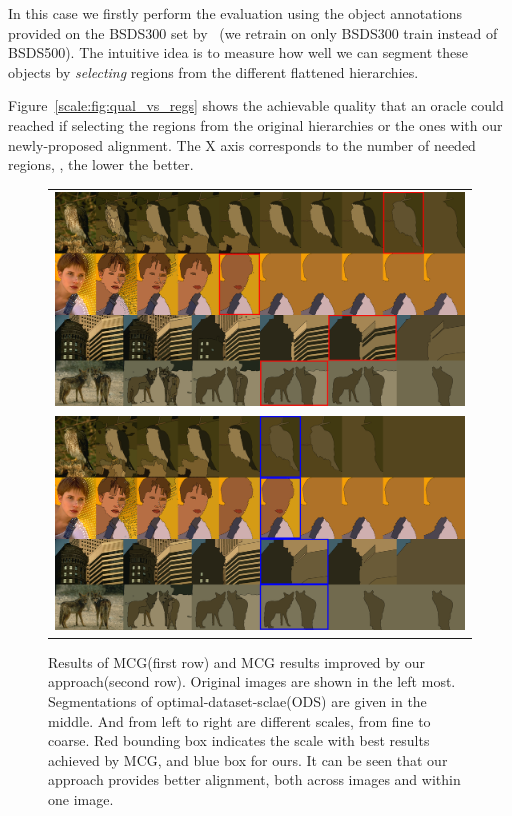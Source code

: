 In this case we firstly perform the evaluation using the object annotations
provided on the BSDS300 set by~\citep{Endres2014} (we retrain on only BSDS300 train instead of BSDS500).
The intuitive idea is to measure how well we can segment these objects by
\textit{selecting} regions from the different flattened hierarchies.

Figure~\ref{scale:fig:qual_vs_regs} shows the achievable quality
that an oracle could reached if selecting the regions from the
original hierarchies or the ones with our newly-proposed alignment.
The X axis corresponds to the number of needed regions, \ie, the lower
the better.

\begin{figure}[tb]
\begin{center}
\begin{tabular}{c}
\includegraphics[width=14.7cm]{scale-aware/fig/vis/stack_1.png} \\
\includegraphics[width=14.7cm]{scale-aware/fig/vis/stack_2.png}
\end{tabular}
\end{center}
\caption{Results of MCG(first row) and MCG results improved by our approach(second row). Original images are shown in the left most. Segmentations of optimal-dataset-sclae(ODS) are given in the middle. And from left to right are different scales, from fine to coarse. Red bounding box indicates the scale with best results achieved by MCG, and blue box for ours. It can be seen that our approach provides better alignment, both across images and within one image. }
\label{scale:fig:mcg_vis2}
\end{figure}


